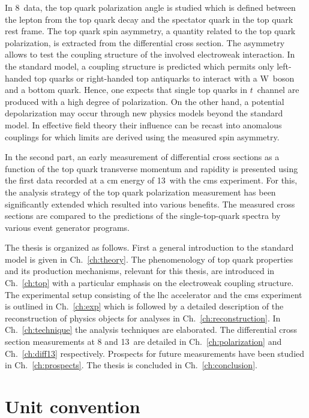 In 8~\TeV data, the top quark polarization angle is studied which is defined between the lepton from the top quark decay and the spectator quark in the top quark rest frame. The top quark spin asymmetry, a quantity related to the top quark polarization, is extracted from the differential cross section. The asymmetry allows to test the coupling structure of the involved electroweak interaction. In the standard model, a  coupling structure is predicted which permits only left-handed top quarks or right-handed top antiquarks to interact with a W~boson and a bottom quark. Hence, one expects that single top quarks in $t$~channel are produced with a high degree of polarization. On the other hand, a potential depolarization may occur through new physics models beyond the standard model. In effective field theory their influence can be recast into anomalous couplings for which limits are derived using the measured spin asymmetry.

In the second part, an early measurement of differential cross sections as a function of the top quark transverse momentum and rapidity is presented using the first data recorded at a \acrlong{cm} energy of 13~\TeV with the \gls{cms} experiment. For this, the analysis strategy of the top quark polarization measurement has been significantly extended which resulted into various benefits.  The measured cross sections are compared to the predictions of the single-top-quark spectra by various event generator programs.

The thesis is organized as follows. First a general introduction to the standard model is given in Ch.~\ref{ch:theory}. The phenomenology of top quark properties and its production mechanisms, relevant for this thesis, are introduced in Ch.~\ref{ch:top} with a particular emphasis on the electroweak coupling structure. The experimental setup consisting of the \gls{lhc} accelerator and the \gls{cms} experiment is outlined in Ch.~\ref{ch:exp} which is followed by a detailed description of the reconstruction of physics objects for analyses in Ch.~\ref{ch:reconstruction}. In Ch.~\ref{ch:technique} the analysis techniques are elaborated. The differential cross section measurements at 8 and 13~\TeV are detailed in Ch.~\ref{ch:polarization} and Ch.~\ref{ch:diff13} respectively. Prospects for future measurements have been studied in Ch.~\ref{ch:prospects}. The thesis is concluded in Ch.~\ref{ch:conclusion}.


\section*{Unit convention}

